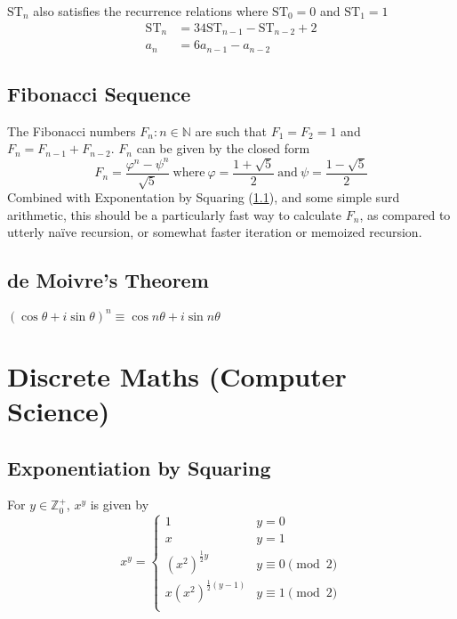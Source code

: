 \documentclass[fleqn,a4paper,11pt]{article}
\begin{document}
    \(\mathrm{ST}_n\) also satisfies the recurrence relations where
    \(\mathrm{ST}_0 = 0\) and \(\mathrm{ST}_1 = 1\)
    \begin{align}
    \mathrm{ST}_n &= 34\mathrm{ST}_{n - 1} - \mathrm{ST}_{n - 2} + 2\\
    a_n &= 6a_{n - 1} - a_{n - 2}
    \end{align}


    \subsection{Fibonacci Sequence}

    The Fibonacci numbers \(F_n: n \in \mathbb{N}\) are such that
    \(F_1 = F_2 = 1\) and \(F_n = F_{n - 1} + F_{n - 2}\).  \(F_n\) can be given
    by the closed form
    \begin{equation}
    F_n = \frac{\varphi^n - \psi^n}{\sqrt 5}
    \ \text{where}\ \varphi = \frac{1 + \sqrt 5} 2
    \ \text{and}\ \psi = \frac{1 - \sqrt 5} 2
    \end{equation}
    Combined with Exponentation by Squaring (\ref{sec_exp_by_squaring}), and
    some simple surd arithmetic, this should be a particularly fast way to
    calculate \(F_n\), as compared to utterly na\"ive recursion, or somewhat
    faster iteration or memoized recursion.

    \subsection{de Moivre's Theorem}

    \((\cos \theta + i \sin \theta)^n \equiv \cos n\theta + i \sin n\theta\)

    \section{Discrete Maths (Computer Science)}

    \subsection{Exponentiation by Squaring} \label{sec_exp_by_squaring}


    For \(y \in \mathbb{Z}_0^+\), \(x^y\) is given by
    \begin{equation}
    x^y =
        \begin{cases}
        1 & y = 0 \\
        x & y = 1 \\
        (x ^ 2)^{\frac 12 y} & y \equiv 0 \pmod 2\\
        x(x ^ 2)^{\frac 12 (y-1)} & y \equiv 1 \pmod 2\\
        \end{cases}
    \end{equation}
\end{document}
